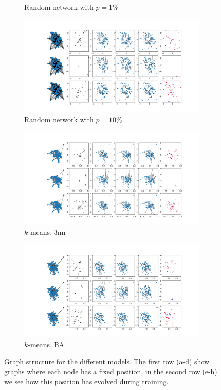 \documentclass[a4paper,10pt]{article}
\begin{document}
\begin{figure}[htbp]
\begin{subfigure}{0.24\textwidth}
    \caption{Random network with $p=1\%$}
  \end{subfigure}
  \begin{subfigure}{0.24\textwidth}
    \centering
    \includegraphics[trim={0 13.2cm 29cm 0},clip,width=\textwidth]{../results/pdfs/rn10-100N-noemb0}
    \caption{Random network with $p=10\%$}
  \end{subfigure}
  \begin{subfigure}{0.24\textwidth}
    \centering
    \includegraphics[trim={0 13.2cm 29cm 0},clip,width=\textwidth]{../results/pdfs/nn-100N-noemb0}
    \caption{$k$-means, 3nn}
  \end{subfigure}
  \begin{subfigure}{0.24\textwidth}
    \centering
    \includegraphics[trim={0 13.2cm 29cm 0},clip,width=\textwidth]{../results/pdfs/ba-100N-noemb0}
    \caption{$k$-means, BA}
  \end{subfigure}
  \caption{Graph structure for the different models. The first row (a-d) show graphs where each node has a fixed position, in the second row (e-h) we see how this position has evolved during training.}
  \label{fig:graphs}
\end{figure}
\end{document}
